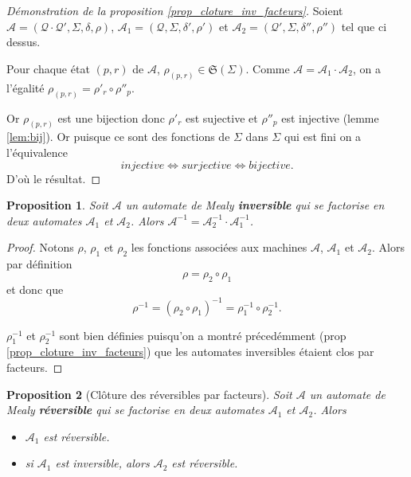 \documentclass[11pt,a4paper]{article}
\newtheorem{prop}{Proposition}
\begin{document}
\begin{proof}[Démonstration de la proposition \ref{prop_cloture_inv_facteurs}]
  Soient $\mathcal{A}=\left(\mathcal{Q\cdot Q'}, \Sigma, \delta, \rho\right)$, $\mathcal{A}_1=\left(\mathcal{Q}, \Sigma, \delta', \rho'\right)$ et $\mathcal{A}_2=\left(\mathcal{Q'}, \Sigma, \delta'', \rho''\right)$ tel que ci dessus.

  Pour chaque état $(p, r)$ de $\mathcal{A}$, $\rho_{(p, r)}\in \mathfrak{S}(\Sigma)$. Comme $\mathcal{A}=\mathcal{A}_1\cdot\mathcal{A}_2$, on a l'égalité $\rho_{(p, r)}=\rho'_r\circ\rho''_p$.

  Or $\rho_{(p, r)}$ est une bijection donc $\rho'_r$ est sujective et $\rho''_p$ est injective (lemme \ref{lem:bij}). Or puisque ce sont des fonctions de $\Sigma$ dans $\Sigma$ qui est fini on a l'équivalence
  \[ injective \iff surjective \iff bijective. \]
  D'où le résultat.
\end{proof}

\begin{prop}\label{prop_inverse_produit}
    Soit $\mathcal{A}$ un automate de Mealy \textbf{inversible} qui se factorise en deux automates $\mathcal{A}_1$ et $\mathcal{A}_2$.
    Alors $\mathcal{A}^{-1} = \mathcal{A}_2^{-1} \cdot \mathcal{A}_1^{-1}$.
\end{prop}

\begin{proof}
  Notons $\rho$, $\rho_1$ et $\rho_2$ les fonctions associées aux machines $\mathcal{A}$, $\mathcal{A}_1$ et $\mathcal{A}_2$. Alors par définition \[ \rho = \rho_2\circ\rho_1 \] et donc que \[ \rho^{-1} = \left(\rho_2\circ\rho_1\right)^{-1} = \rho_1^{-1}\circ\rho_2^{-1}. \]

  $\rho_1^{-1}$ et $\rho_2^{-1}$ sont bien définies puisqu'on a montré précedémment (prop \ref{prop_cloture_inv_facteurs}) que les automates inversibles étaient clos par facteurs.
\end{proof}

\begin{prop}[Clôture des réversibles par facteurs]\label{prop_cloture_rev_facteurs}
  Soit $\mathcal{A}$ un automate de Mealy \textbf{réversible} qui se factorise en deux automates $\mathcal{A}_1$ et $\mathcal{A}_2$. Alors
  \begin{itemize}
  \item $\mathcal{A}_1$ est réversible.
  \item si $\mathcal{A}_1$ est inversible, alors $\mathcal{A}_2$ est réversible.
  \end{itemize}
\end{prop}
\end{document}

